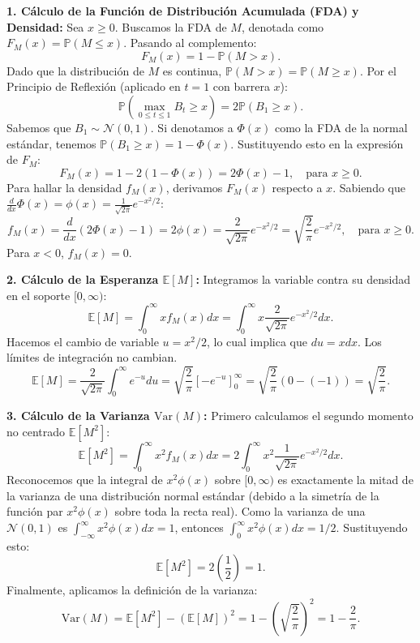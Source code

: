 \documentclass[11pt, letterpaper]{article}
\begin{document}
\begin{solucion}
    \textbf{1. Cálculo de la Función de Distribución Acumulada (FDA) y Densidad:}
    Sea $x \ge 0$. Buscamos la FDA de $M$, denotada como $F_M(x) = \mathbb{P}(M \le x)$.
    Pasando al complemento:
    \[ F_M(x) = 1 - \mathbb{P}(M > x). \]
    Dado que la distribución de $M$ es continua, $\mathbb{P}(M > x) = \mathbb{P}(M \ge x)$.
    Por el Principio de Reflexión (aplicado en $t=1$ con barrera $x$):
    \[ \mathbb{P}\left( \max_{0 \le t \le 1} B_t \ge x \right) = 2\mathbb{P}(B_1 \ge x). \]
    Sabemos que $B_1 \sim \mathcal{N}(0, 1)$. Si denotamos a $\Phi(x)$ como la FDA de la normal estándar, tenemos $\mathbb{P}(B_1 \ge x) = 1 - \Phi(x)$.
    Sustituyendo esto en la expresión de $F_M$:
    \[ F_M(x) = 1 - 2(1 - \Phi(x)) = 2\Phi(x) - 1, \quad \text{para } x \ge 0. \]
    Para hallar la densidad $f_M(x)$, derivamos $F_M(x)$ respecto a $x$. Sabiendo que $\frac{d}{dx}\Phi(x) = \phi(x) = \frac{1}{\sqrt{2\pi}}e^{-x^2/2}$:
    \[ f_M(x) = \frac{d}{dx}(2\Phi(x) - 1) = 2\phi(x) = \frac{2}{\sqrt{2\pi}} e^{-x^2/2} = \sqrt{\frac{2}{\pi}} e^{-x^2/2}, \quad \text{para } x \ge 0. \]
    Para $x < 0$, $f_M(x) = 0$.

    \textbf{2. Cálculo de la Esperanza $\mathbb{E}[M]$:}
    Integramos la variable contra su densidad en el soporte $[0, \infty)$:
    \[ \mathbb{E}[M] = \int_0^\infty x f_M(x) dx = \int_0^\infty x \frac{2}{\sqrt{2\pi}} e^{-x^2/2} dx. \]
    Hacemos el cambio de variable $u = x^2/2$, lo cual implica que $du = x dx$. Los límites de integración no cambian.
    \[ \mathbb{E}[M] = \frac{2}{\sqrt{2\pi}} \int_0^\infty e^{-u} du = \sqrt{\frac{2}{\pi}} \left[ -e^{-u} \right]_0^\infty = \sqrt{\frac{2}{\pi}} (0 - (-1)) = \sqrt{\frac{2}{\pi}}. \]

    \textbf{3. Cálculo de la Varianza $\text{Var}(M)$:}
    Primero calculamos el segundo momento no centrado $\mathbb{E}[M^2]$:
    \[ \mathbb{E}[M^2] = \int_0^\infty x^2 f_M(x) dx = 2 \int_0^\infty x^2 \frac{1}{\sqrt{2\pi}} e^{-x^2/2} dx. \]
    Reconocemos que la integral de $x^2 \phi(x)$ sobre $[0, \infty)$ es exactamente la mitad de la varianza de una distribución normal estándar (debido a la simetría de la función par $x^2 \phi(x)$ sobre toda la recta real).
    Como la varianza de una $\mathcal{N}(0,1)$ es $\int_{-\infty}^\infty x^2 \phi(x) dx = 1$, entonces $\int_0^\infty x^2 \phi(x) dx = 1/2$.
    Sustituyendo esto:
    \[ \mathbb{E}[M^2] = 2 \left( \frac{1}{2} \right) = 1. \]
    Finalmente, aplicamos la definición de la varianza:
    \[ \text{Var}(M) = \mathbb{E}[M^2] - (\mathbb{E}[M])^2 = 1 - \left( \sqrt{\frac{2}{\pi}} \right)^2 = 1 - \frac{2}{\pi}. \]
\end{solucion}
\end{document}
